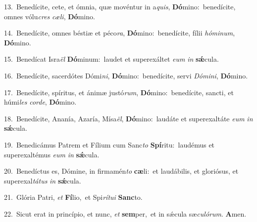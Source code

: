{\numbfont\textcolor{\numbcolor}{13.}}~Benedícite, cete, et ómnia, quæ movéntur in a\-\textit{quis}\-, \textbf{Dó}\-mino:~\star benedícite, omnes vólu\textit{cres} \textit{cæ}\-\textit{li}, \textbf{Dó}\-mino.\par
{\numbfont\textcolor{\numbcolor}{14.}}~Benedícite, omnes béstiæ et péco\-\textit{ra}\-, \textbf{Dó}\-mino:~\star benedícite, fílii \textit{hó}\-\textit{mi}\textit{num}, \textbf{Dó}\-mino.\par
{\numbfont\textcolor{\numbcolor}{15.}}~Benedícat Isra\textit{ël} \textbf{Dó}\-minum:~\star laudet et superexáltet \textit{e}\-\textit{um} \textit{in} \textbf{sǽ}\-cula.\par
{\numbfont\textcolor{\numbcolor}{16.}}~Benedícite, sacerdótes Dómi\-\textit{ni}\-, \textbf{Dó}\-mino:~\star benedícite, servi \textit{Dó}\-\textit{mi}\textit{ni}, \textbf{Dó}\-mino.\par
{\numbfont\textcolor{\numbcolor}{17.}}~Benedícite, spíritus, et ánimæ justó\-\textit{rum}\-, \textbf{Dó}\-mino:~\star benedícite, sancti, et húmi\textit{les} \textit{cor}\-\textit{de}, \textbf{Dó}\-mino.\par
{\numbfont\textcolor{\numbcolor}{18.}}~Benedícite, Ananía, Azaría, Mísa\-\textit{ël}\-, \textbf{Dó}\-mino:~\star laudáte et superexaltáte \textit{e}\-\textit{um} \textit{in} \textbf{sǽ}\-cula.\par
{\numbfont\textcolor{\numbcolor}{19.}}~Benedicámus Patrem et Fílium cum Sanc\textit{to} \textbf{Spí}\-ritu:~\star laudémus et superexaltémus \textit{e}\-\textit{um} \textit{in} \textbf{sǽ}\-cula.\par
{\numbfont\textcolor{\numbcolor}{20.}}~Benedíctus es, Dómine, in firmamén\textit{to} \textbf{cæ}\-li:~\star et laudábilis, et gloriósus, et superexal\-\textit{tá}\-\textit{tus} \textit{in} \textbf{sǽ}\-cula.\par
{\numbfont\textcolor{\numbcolor}{21.}}~Glória Patri, \textit{et} \textbf{Fí}\-lio,~\star et Spi\-\textit{rí}\-\textit{tu}\textit{i} \textbf{Sanc}\-to.\par
{\numbfont\textcolor{\numbcolor}{22.}}~Sicut erat in princípio, et nunc, \textit{et} \textbf{sem}\-per,~\star et in sǽcula sæ\-\textit{cu}\-\textit{ló}\textit{rum}. \textbf{A}\-men.\par
